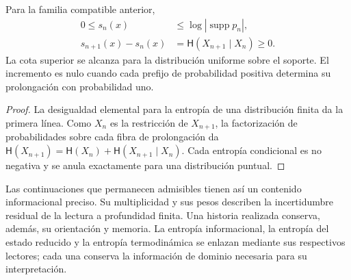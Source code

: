 \begin{proposition}
Para la familia compatible anterior,
\begin{align}
 0\leq s_n(x)&\leq\log|\operatorname{supp}p_n|,\\
 s_{n+1}(x)-s_n(x)
 &=\mathsf H(X_{n+1}\mid X_n)\geq0.
 \label{ii:eq:ii-entropia-refinamiento}
\end{align}
La cota superior se alcanza para la distribución uniforme sobre el
soporte. El incremento es nulo cuando cada prefijo de probabilidad
positiva determina su prolongación con probabilidad uno.
\end{proposition}
\begin{proof}
La desigualdad elemental para la entropía de una distribución finita
da la primera línea. Como \(X_n\) es la restricción de \(X_{n+1}\),
la factorización de probabilidades sobre cada fibra de prolongación
da \(\mathsf H(X_{n+1})=\mathsf H(X_n)+
\mathsf H(X_{n+1}\mid X_n)\). Cada entropía condicional es no
negativa y se anula exactamente para una distribución puntual.
\end{proof}

Las continuaciones que permanecen admisibles tienen así un contenido
informacional preciso. Su multiplicidad y sus pesos describen la
incertidumbre residual de la lectura a profundidad finita. Una
historia realizada conserva, además, su orientación y memoria. La
entropía informacional, la entropía del estado reducido y la entropía
termodinámica se enlazan mediante sus respectivos lectores; cada una
conserva la información de dominio necesaria para su interpretación.
